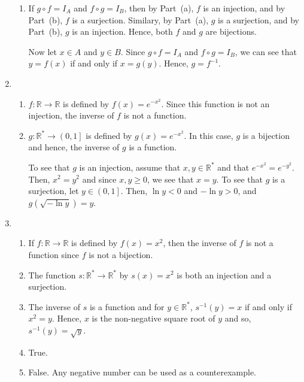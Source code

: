 \begin{enumerate}
\begin{enumerate}
\item If $g \circ f = I_A$ and $f \circ g = I_B$, then by Part~(a), $f$ is an injection, and by Part~(b), $f$ is a surjection.  Similary, by Part~(a), $g$ is a surjection, and by Part~(b), $g$ is an injection.  Hence, both $f$ and $g$ are bijections.

Now let $x \in A$ and $y \in B$.  Since $g \circ f = I_A$ and $f \circ g = I_B$, we can see that 
$y = f \left( x \right)$ if and only if $x = g \left( y \right)$.  Hence, $g = f^{-1}$. 
\end{enumerate}


\item \begin{enumerate}
\item $f:\mathbb{R} \to \mathbb{R}$ is defined by $f\left( x \right) = e^{ - x^2 } $.  Since this function is not an injection, the inverse of $f$ is not a function.

\item $g:\mathbb{R}^*  \to \left( {0, 1} \right]$ is defined by $g\left( x \right) = e^{ - x^2 }$.  In this case, $g$ is a bijection and hence, the inverse of $g$ is a function.

To see that $g$ is an injection, assume that $x, y \in \mathbb{R}^*$ and that 
$e^{-x^2} = e^{-y^2}$.  Then, $x^2 = y^2$ and since $x, y \geq 0$, we see that $x = y$.  To see that $g$ is a surjection, let $y \in \left( 0, 1 \right]$.  Then, $\ln y < 0$ and $- \ln y > 0$, and $g \left( \sqrt{-\ln y} \right) = y$.
\end{enumerate}


\item \begin{enumerate}
\item If $f:\mathbb{R} \to \mathbb{R}$ is defined by  $f\left( x \right) = x^2 $, then the inverse of $f$ is not a function since $f$ is not a bijection.

\item The function $s: \mathbb{R}^* \to \mathbb{R}^*$ by $s \left( x \right) = x^2$ is both an injection and a surjection.

\item The inverse of $s$ is a function and for $y \in \mathbb{R}^*$, 
$s^{-1} \left( y \right) = x$ if and only if $x^2 = y$.  Hence, $x$ is the non-negative square root of $y$ and so, $s^{-1} \left( y \right) = \sqrt y$.

\item True.  
\item False.  Any negative number can be used as a counterexample.  
\end{enumerate}




\end{enumerate}

